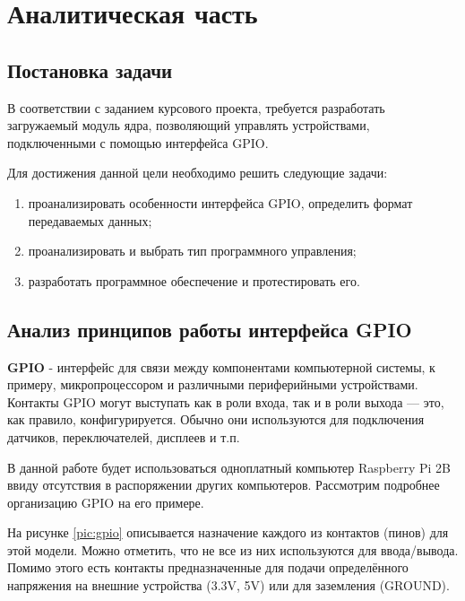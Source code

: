 \section{Аналитическая часть}

\subsection{Постановка задачи}\label{sec:task}
В соответствии с заданием курсового проекта, требуется разработать загружаемый модуль ядра, позволяющий управлять устройствами, подключенными с помощью интерфейса GPIO.

Для достижения данной цели необходимо решить следующие задачи:
\begin{enumerate}
	\item проанализировать особенности интерфейса GPIO, определить формат передаваемых данных;
	\item проанализировать и выбрать тип программного управления;
	\item разработать программное обеспечение и протестировать его.
\end{enumerate}

\subsection{Анализ принципов работы интерфейса GPIO}
\textbf{GPIO} - интерфейс для связи между компонентами компьютерной системы, к примеру, микропроцессором и различными периферийными устройствами\cite{subj:def}. Контакты GPIO могут выступать как в роли входа, так и в роли выхода — это, как правило, конфигурируется. Обычно они используются для подключения датчиков, переключателей, дисплеев и т.п.

В данной работе будет использоваться одноплатный компьютер Raspberry Pi 2B ввиду отсутствия в распоряжении других компьютеров. Рассмотрим подробнее организацию GPIO на его примере.

На рисунке \ref{pic:gpio} описывается назначение каждого из контактов (пинов)  для этой модели. Можно отметить, что не все из них используются для ввода/вывода. Помимо этого есть контакты предназначенные для подачи определённого напряжения на внешние устройства (3.3V, 5V) или для заземления (GROUND).


